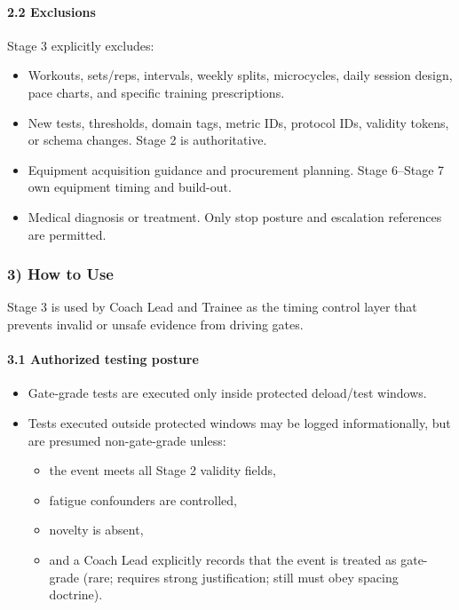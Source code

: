 \documentclass[10pt]{article}
\begin{document}
\paragraph*{2.2 Exclusions}

Stage 3 explicitly excludes:

\begin{itemize}
\item Workouts, sets/reps, intervals, weekly splits, microcycles, daily session design, pace charts, and specific training prescriptions.
\item New tests, thresholds, domain tags, metric IDs, protocol IDs, validity tokens, or schema changes. Stage 2 is authoritative.
\item Equipment acquisition guidance and procurement planning. Stage 6–Stage 7 own equipment timing and build-out.
\item Medical diagnosis or treatment. Only stop posture and escalation references are permitted.
\end{itemize}

\subsubsection*{3) How to Use}

Stage 3 is used by Coach Lead and Trainee as the timing control layer that prevents invalid or unsafe evidence from driving gates.

\paragraph*{3.1 Authorized testing posture}

\begin{itemize}
\item Gate-grade tests are executed only inside protected deload/test windows.
\item Tests executed outside protected windows may be logged informationally, but are presumed non-gate-grade unless:
  \begin{itemize}
  \item the event meets all Stage 2 validity fields,
  \item fatigue confounders are controlled,
  \item novelty is absent,
  \item and a Coach Lead explicitly records that the event is treated as gate-grade (rare; requires strong justification; still must obey spacing doctrine).
  \end{itemize}
\end{itemize}
\end{document}
